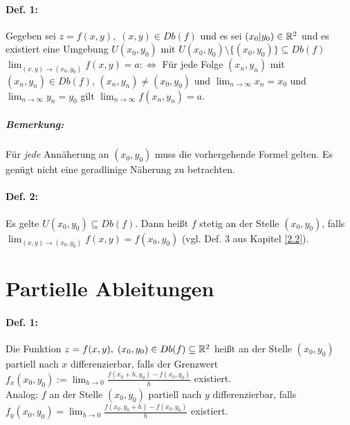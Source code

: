 \paragraph{Def. 1:} Gegeben sei $z=f(x,y), \; (x,y) \in Db(f)$ und es sei $(x_0|y_0) \in \mathbb{R}^2$ und es existiert eine Umgebung $U(x_0, y_0)$ mit $U(x_0, y_0) \setminus \{(x_0,y_0)\} \subseteq Db(f)$\\
$\lim_{(x,y) \to (x_0, y_0)} f(x,y) = a : \Leftrightarrow $ Für jede Folge $(x_n, y_n)$ mit $(x_n, y_n) \in Db(f)$, $(x_n, y_n) \not = (x_0, y_0)$ und $\lim_{n\to \infty} x_n =x_0$ und $\lim_{n\to \infty} y_n = y_0$ gilt $\lim_{n\to \infty} f(x_n,y_n) = a$.
\subparagraph{Bemerkung:} Für \emph{jede} Annäherung an $(x_0,y_0)$ muss die vorhergehende Formel gelten. Es genügt nicht eine geradlinige Näherung zu betrachten.
\paragraph{Def. 2:} Es gelte $U(x_0,y_0) \subseteq Db(f)$. Dann heißt $f$ stetig an der Stelle $(x_0,y_0)$, falls \\
$\lim_{(x,y)\to (x_0,y_0)} f(x,y) = f(x_0,y_0)$ (vgl. Def. 3 aus Kapitel \ref{2.2}). 

\section{Partielle Ableitungen}
\paragraph{Def. 1:} Die Funktion $z=f(x,y), \; (x_0,y_0) \in Db(f) \subseteq \mathbb{R}^2$ heißt an der Stelle $(x_0,y_0)$ partiell nach $x$ differenzierbar, falls der Grenzwert \\
$\boxed{f_x(x_0, y_0) := \lim_{h\to 0} \frac{f(x_0+h,y_0) - f(x_0,y_0)}{h}}$ existiert.\\
Analog: $f$ an der Stelle $(x_0,y_0)$ partiell nach $y$ differenzierbar, falls \\
$\boxed{f_y(x_0,y_0)=\lim_{h\to 0} \frac{f(x_0,y_0+h) - f(x_0,y_0)}{h}}$ existiert.

